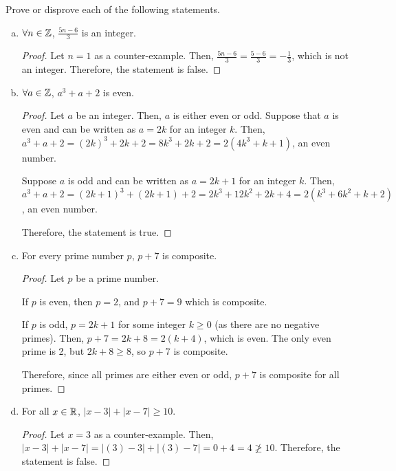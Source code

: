 \question Prove or disprove each of the following statements.
\begin{enumerate}[(a)]
  \item $\forall n\in\mathbb{Z}$, $\frac{5n-6}{3}$ is an integer.
        \begin{proof}
          Let $n=1$ as a counter-example.
          Then, $\frac{5n-6}{3}=\frac{5-6}{3}=-\frac{1}{3}$, which is not an integer.
          Therefore, the statement is false.
        \end{proof}

  \item $\forall a\in\mathbb{Z}$, $a^3+a+2$ is even.
        \begin{proof}
          Let $a$ be an integer. Then, $a$ is either even or odd.
          Suppose that $a$ is even and can be written as $a=2k$ for an integer $k$.
          Then, $a^3+a+2=(2k)^3+2k+2=8k^3+2k+2=2(4k^3+k+1)$, an even number.

          Suppose $a$ is odd and can be written as $a=2k+1$ for an integer $k$.
          Then, $a^3+a+2 = (2k+1)^3 + (2k+1) + 2 = 2k^3 + 12k^2 + 2k + 4 = 2(k^3 + 6k^2 + k + 2)$, an even number.

          Therefore, the statement is true.
        \end{proof}

  \item For every prime number $p$, $p + 7$ is composite.
        \begin{proof}
          Let $p$ be a prime number.

          If $p$ is even, then $p = 2$, and $p + 7 = 9$ which is composite.

          If $p$ is odd, $p = 2k + 1$ for some integer $k \geq 0$ (as there are no negative primes).
          Then, $p + 7 = 2k + 8 = 2(k + 4)$, which is even.
          The only even prime is 2, but $2k + 8 \geq 8$, so $p + 7$ is composite.

          Therefore, since all primes are either even or odd, $p + 7$ is composite for all primes.
        \end{proof}

  \item For all $x \in \mathbb{R}$, $|x-3| + |x-7| \geq 10$.
        \begin{proof}
          Let $x=3$ as a counter-example.
          Then, $|x-3|+|x-7|=|(3)-3|+|(3)-7|=0+4=4 \not\geq 10$.
          Therefore, the statement is false.
        \end{proof}


\end{enumerate}
